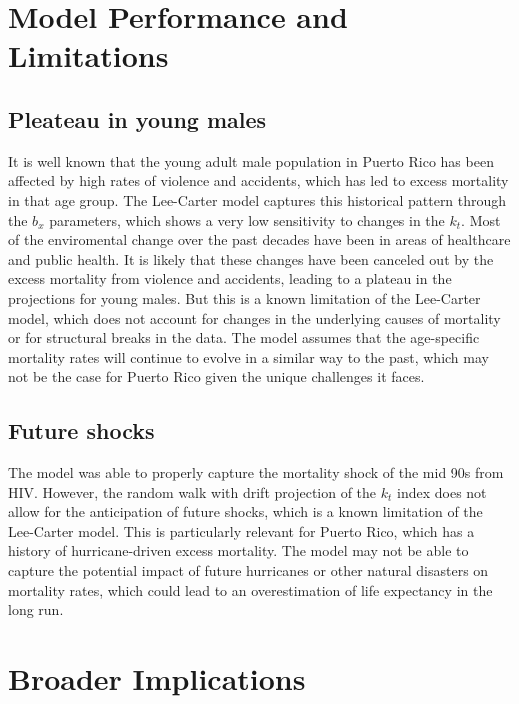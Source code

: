 \documentclass[
  12pt,
]{report}
\begin{document}
\section{Model Performance and
Limitations}\label{model-performance-and-limitations}

\subsection{Pleateau in young males}\label{pleateau-in-young-males}

It is well known that the young adult male population in Puerto Rico has
been affected by high rates of violence and accidents, which has led to
excess mortality in that age group. The Lee-Carter model captures this
historical pattern through the \(b_x\) parameters, which shows a very
low sensitivity to changes in the \(k_t\). Most of the enviromental
change over the past decades have been in areas of healthcare and public
health. It is likely that these changes have been canceled out by the
excess mortality from violence and accidents, leading to a plateau in
the projections for young males. But this is a known limitation of the
Lee-Carter model, which does not account for changes in the underlying
causes of mortality or for structural breaks in the data. The model
assumes that the age-specific mortality rates will continue to evolve in
a similar way to the past, which may not be the case for Puerto Rico
given the unique challenges it faces.

\subsection{Future shocks}\label{future-shocks}

The model was able to properly capture the mortality shock of the mid
90s from HIV. However, the random walk with drift projection of the
\(k_t\) index does not allow for the anticipation of future shocks,
which is a known limitation of the Lee-Carter model. This is
particularly relevant for Puerto Rico, which has a history of
hurricane-driven excess mortality. The model may not be able to capture
the potential impact of future hurricanes or other natural disasters on
mortality rates, which could lead to an overestimation of life
expectancy in the long run.

\section{Broader Implications}\label{broader-implications}
\end{document}
